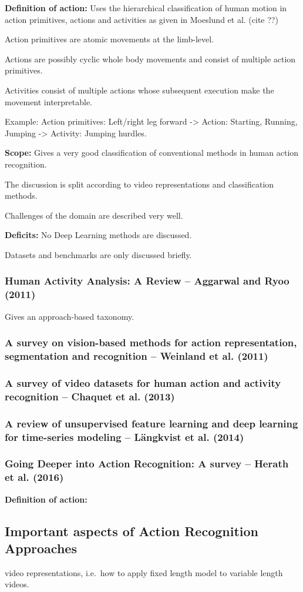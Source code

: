 \textbf{Definition of action:} Uses the hierarchical classification of human motion in action primitives, actions and activities as given in Moeslund et al. (cite ??)

Action primitives are atomic movements at the limb-level.

Actions are possibly cyclic whole body movements and consist of multiple action primitives.

Activities consist of multiple actions whose subsequent execution make the movement interpretable.

Example: Action primitives: Left/right leg forward -> Action: Starting, Running, Jumping -> Activity: Jumping hurdles.

\textbf{Scope:} Gives a very good classification of conventional methods in human action recognition.

The discussion is split according to video representations and classification methods.

Challenges of the domain are described very well.

\textbf{Deficits:} No Deep Learning methods are discussed.

Datasets and benchmarks are only discussed briefly.

\subsubsection{Human Activity Analysis: A Review -- Aggarwal and Ryoo (2011)}

Gives an approach-based taxonomy.

\subsubsection{A survey on vision-based methods for action representation, segmentation and recognition -- Weinland et al. (2011)}

\subsubsection{A survey of video datasets for human action and activity recognition -- Chaquet et al. (2013)}

\subsubsection{A review of unsupervised feature learning and deep learning for time-series modeling -- Längkvist et al. (2014)}

\subsubsection{Going Deeper into Action Recognition: A survey -- Herath et al. (2016)}

\textbf{Definition of action:} 

\subsection{Important aspects of Action Recognition Approaches}
video representations, i.e.\ how to apply fixed length model to variable length videos.
